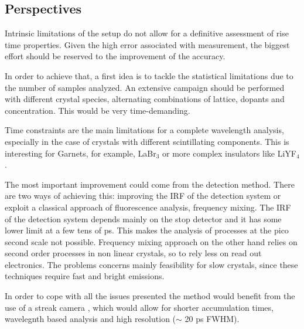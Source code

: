 \subsection{Perspectives}
Intrinsic limitations of the setup do not allow for a definitive assessment of rise time properties. Given the high error associated with measurement, the biggest effort should be reserved to the improvement of the accuracy.

In order to achieve that, a first idea is to tackle the statistical limitations due to the number of samples analyzed. An extensive campaign should be performed with different crystal species, alternating combinations of lattice, dopants and concentration. This would be very time-demanding.

Time constraints are the main limitations for a complete wavelength analysis, especially in the case of crystals with different scintillating components. This is interesting for Garnets, for example, LaBr$_{3}$ or more complex insulators like LiYF$_{4}$.

The most important improvement could come from the detection method. There are two ways of achieving this: improving the IRF of the detection system or exploit a classical approach of fluorescence analysis, frequency mixing. The IRF of the detection system depends mainly on the stop detector and it has some lower limit at a few tens of ps. This makes the analysis of processes at the pico second scale not possible.
Frequency mixing approach on the other hand relies on second order processes in non linear crystals, so to rely less on read out electronics. The problems concerns mainly feasibility for slow crystals, since these techniques require fast and bright emissions.

In order to cope with all the issues presented the method would benefit from the use of a streak camera \cite{streak}, which would allow for shorter accumulation times, wavelegnth based analysis and high resolution ($\sim$ 20 ps FWHM). 